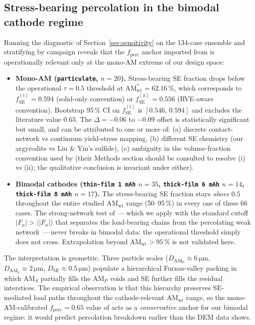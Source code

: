 \documentclass[11pt, a4paper]{article}
\begin{document}
\subsection{Stress-bearing percolation in the bimodal cathode
            regime}
\label{sec:bimodal-perc}
Running the diagnostic of Section~\ref{sec:sensitivity} on the
134-case ensemble and stratifying by campaign reveals that the
$f_{\mathrm{perc}}$ anchor imported from \citet{LiuYin2025} is
operationally relevant only at the mono-AM extreme of our design
space:

\begin{itemize}
\item \textbf{Mono-AM (\texttt{particulate}, $n = 20$).}
      Stress-bearing SE fraction drops below the operational
      $\tau = 0.5$ threshold at $\mathrm{AM}_{\mathrm{wt}}^{*} =
      62.16\,\%$, which corresponds to $f_{\mathrm{SE}}^{\mathrm{(i)}}
      = 0.594$ (solid-only convention) or
      $f_{\mathrm{SE}}^{\mathrm{(ii)}} = 0.556$ (RVE-aware
      convention).  Bootstrap 95\,\% CI on
      $f_{\mathrm{SE}}^{\mathrm{(i)}}$ is $[0.546,\,0.594]$ and
      excludes the literature value $0.65$.  The
      $\Delta = -0.06$ to $-0.09$ offset is statistically
      significant but small, and can be attributed to one or more
      of: (a) discrete contact-network vs continuum yield-stress
      mapping, (b) different SE chemistry (our argyrodite vs Liu
      \& Yin's sulfide), (c) ambiguity in the volume-fraction
      convention used by \citet{LiuYin2025} (their Methods section
      should be consulted to resolve (i) vs (ii); the qualitative
      conclusion is invariant under either).
\item \textbf{Bimodal cathodes (\texttt{thin-film 1\,mAh} $n = 35$,
      \texttt{thick-film 6\,mAh} $n = 14$, \texttt{thick-film
      8\,mAh} $n = 17$).}  The stress-bearing SE fraction stays
      \emph{above} $0.5$ throughout the entire studied
      AM$_{\mathrm{wt}}$ range (50--95\,\%) in every one of these
      66 cases.  The strong-network test of
      \citet{Radjai1996}\,---\,which we apply with the standard
      cutoff $|F_n| > \langle |F_n| \rangle$ that separates the
      load-bearing chains from the percolating weak network
      \citep{Mueth1998, Majmudar2005}\,---\,never breaks in bimodal
      data: the operational threshold simply does not cross.
      Extrapolation beyond AM$_{\mathrm{wt}} > 95\,\%$ is not
      validated here.
\end{itemize}

The interpretation is geometric.  Three particle scales
($D_{\mathrm{AM_P}} \approx 6\,\si{\micro\metre}$,
 $D_{\mathrm{AM_S}} \approx 2\,\si{\micro\metre}$,
 $D_{\mathrm{SE}} \approx 0.5\,\si{\micro\metre}$) populate a
hierarchical Furnas-valley packing in which AM$_S$ partially fills
the AM$_P$ voids and SE further fills the residual interstices.
The empirical observation is that this hierarchy preserves
SE-mediated load paths throughout the cathode-relevant
AM$_{\mathrm{wt}}$ range, so the mono-AM-calibrated
$f_{\mathrm{perc}} = 0.65$ value of \citet{LiuYin2025} acts as a
\emph{conservative} anchor for our bimodal regime: it would
predict percolation breakdown earlier than the DEM data shows.
\end{document}
